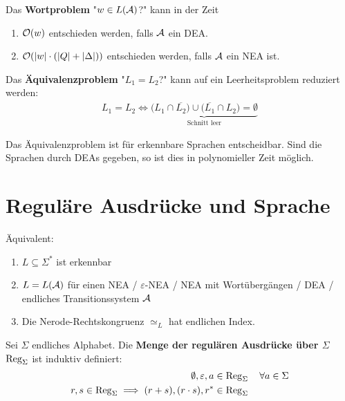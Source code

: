 \begin{satz}\label{satz4.4+4.5}
	Das \textbf{Wortproblem} "$w\in L(\mathcal{A})$?" kann in der Zeit
	\begin{enumerate}
		\item $\mathcal{O}(w)$ entschieden werden, falls $\mathcal{A}$ ein DEA.
		\item $\mathcal{O}(|w|\cdot(|Q|+|\Delta|))$ entschieden werden, falls $\mathcal{A}$ ein NEA ist.
	\end{enumerate}
\end{satz}

Das \textbf{Äquivalenzproblem} "$L_1=L_2$?" kann auf ein Leerheitsproblem reduziert werden:
\begin{align*}
	L_1=L_2\Longleftrightarrow\underbrace{\big(L_1\cap\overline{L_2}\big)\cup\big(\overline{L_1}\cap L_2\big)=\emptyset}_{\text{Schnitt leer}}
\end{align*}

\begin{satz}\label{satz4.6}
	Das Äquivalenzproblem ist für erkennbare Sprachen entscheidbar.
	Sind die Sprachen durch DEAs gegeben, so ist dies in polynomieller Zeit möglich.
\end{satz}

\section{Reguläre Ausdrücke und Sprache}

\begin{korollar}
Äquivalent:
	\begin{enumerate}[label=\arabic*)]
		\item $L\subseteq\Sigma^\ast$ ist erkennbar
		\item $L=L(\mathcal{A})$ für einen NEA / $\varepsilon$-NEA / NEA mit Wortübergängen / DEA / endliches Transitionssystem $\mathcal{A}$
		\item Die Nerode-Rechtskongruenz $\simeq_L$ hat endlichen Index.
	\end{enumerate}
\end{korollar}

\begin{definition}\label{def5.1}
	Sei $\Sigma$ endliches Alphabet.
	Die \textbf{Menge der regulären Ausdrücke über $\Sigma$} $\operatorname{Reg}_\Sigma$ ist induktiv definiert:
	\begin{align*}
		\emptyset,\varepsilon,a&\in\operatorname{Reg}_\Sigma\quad\forall a\in\Sigma\\
		r,s\in\operatorname{Reg}_\Sigma\implies(r+s),(r\cdot s),r^\ast&\in\operatorname{Reg}_\Sigma
	\end{align*}
\end{definition}

